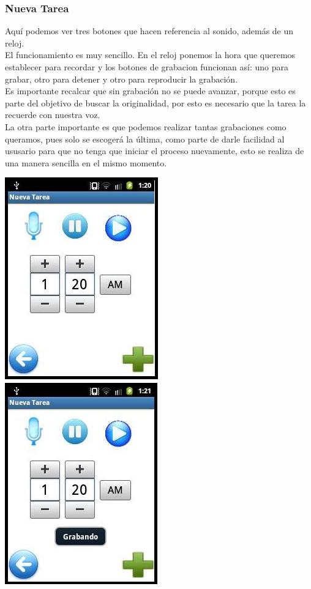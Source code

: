 \documentclass[10pt]{article}
\begin{document}
{\begin{flushleft}
\newpage
\subsubsection{Nueva Tarea}
Aqu\'i podemos ver tres botones que hacen referencia al sonido, adem\'as de un reloj.\\
El funcionamiento es muy sencillo. En el reloj ponemos la hora que queremos establecer para recordar y los botones de grabacion funcionan así: uno para grabar, otro para detener y otro para reproducir la grabaci\'on.\\
Es importante recalcar que sin grabaci\'on no se puede avanzar, porque esto es parte del objetivo de buscar la originalidad, por esto es necesario que la tarea la recuerde con nuestra voz.\\
La otra parte importante es que podemos realizar tantas grabaciones como queramos, pues solo se escoger\'a la \'ultima, como parte de darle facilidad al ususario para que no tenga que iniciar el proceso nuevamente, esto se realiza de una manera sencilla en el mismo momento.\\

\begin{center}
\vspace{0.4in}
\includegraphics[scale=0.8]{NuevaTarea1.jpg}
\hspace{0.4in}\includegraphics[scale=0.8]{NuevaTarea2.jpg}
\end{center}


\end{flushleft}}
\end{document}
